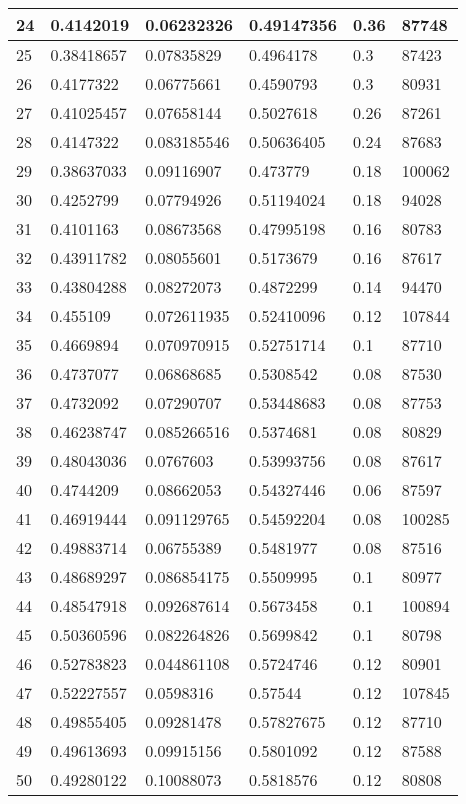\begin{longtable}{|l|l|l|l|l|l|}
24 & 0.4142019 & 0.06232326 & 0.49147356 & 0.36 & 87748 \\ \hline 
25 & 0.38418657 & 0.07835829 & 0.4964178 & 0.3 & 87423 \\ \hline 
26 & 0.4177322 & 0.06775661 & 0.4590793 & 0.3 & 80931 \\ \hline 
27 & 0.41025457 & 0.07658144 & 0.5027618 & 0.26 & 87261 \\ \hline 
28 & 0.4147322 & 0.083185546 & 0.50636405 & 0.24 & 87683 \\ \hline 
29 & 0.38637033 & 0.09116907 & 0.473779 & 0.18 & 100062 \\ \hline 
30 & 0.4252799 & 0.07794926 & 0.51194024 & 0.18 & 94028 \\ \hline 
31 & 0.4101163 & 0.08673568 & 0.47995198 & 0.16 & 80783 \\ \hline 
32 & 0.43911782 & 0.08055601 & 0.5173679 & 0.16 & 87617 \\ \hline 
33 & 0.43804288 & 0.08272073 & 0.4872299 & 0.14 & 94470 \\ \hline 
34 & 0.455109 & 0.072611935 & 0.52410096 & 0.12 & 107844 \\ \hline 
35 & 0.4669894 & 0.070970915 & 0.52751714 & 0.1 & 87710 \\ \hline 
36 & 0.4737077 & 0.06868685 & 0.5308542 & 0.08 & 87530 \\ \hline 
37 & 0.4732092 & 0.07290707 & 0.53448683 & 0.08 & 87753 \\ \hline 
38 & 0.46238747 & 0.085266516 & 0.5374681 & 0.08 & 80829 \\ \hline 
39 & 0.48043036 & 0.0767603 & 0.53993756 & 0.08 & 87617 \\ \hline 
40 & 0.4744209 & 0.08662053 & 0.54327446 & 0.06 & 87597 \\ \hline 
41 & 0.46919444 & 0.091129765 & 0.54592204 & 0.08 & 100285 \\ \hline 
42 & 0.49883714 & 0.06755389 & 0.5481977 & 0.08 & 87516 \\ \hline 
43 & 0.48689297 & 0.086854175 & 0.5509995 & 0.1 & 80977 \\ \hline 
44 & 0.48547918 & 0.092687614 & 0.5673458 & 0.1 & 100894 \\ \hline 
45 & 0.50360596 & 0.082264826 & 0.5699842 & 0.1 & 80798 \\ \hline 
46 & 0.52783823 & 0.044861108 & 0.5724746 & 0.12 & 80901 \\ \hline 
47 & 0.52227557 & 0.0598316 & 0.57544 & 0.12 & 107845 \\ \hline 
48 & 0.49855405 & 0.09281478 & 0.57827675 & 0.12 & 87710 \\ \hline 
49 & 0.49613693 & 0.09915156 & 0.5801092 & 0.12 & 87588 \\ \hline 
50 & 0.49280122 & 0.10088073 & 0.5818576 & 0.12 & 80808 \\ \hline 
\end{longtable}